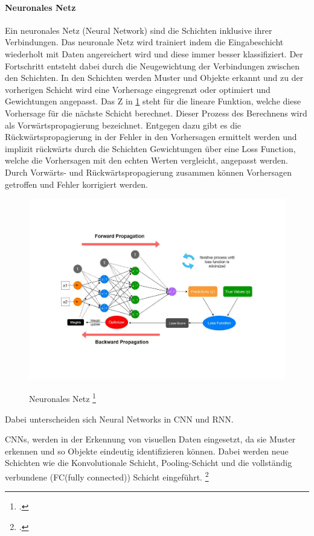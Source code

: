 \paragraph{Neuronales Netz}
Ein neuronales Netz (Neural Network) sind die Schichten inklusive ihrer Verbindungen.
Das neuronale Netz wird trainiert indem die Eingabeschicht 
wiederholt mit Daten angereichert wird und diese immer besser klassifiziert.
Der Fortschritt entsteht dabei durch die Neugewichtung der Verbindungen 
zwischen den Schichten. 
In den Schichten werden Muster und Objekte erkannt und zu der vorherigen Schicht
wird eine Vorhersage eingegrenzt oder optimiert 
und Gewichtungen angepasst. 
Das Z in \ref{fig:NN} steht für die lineare Funktion, 
welche diese Vorhersage für die nächste Schicht berechnet.
Dieser Prozess des Berechnens wird als 
Vorwärtspropagierung bezeichnet. 
Entgegen dazu gibt es die Rückwärtspropagierung 
in der Fehler in den Vorhersagen ermittelt werden 
und implizit rückwärts durch die Schichten 
Gewichtungen über eine Loss Function, 
welche die Vorhersagen mit den echten Werten vergleicht, 
angepasst werden. 
Durch Vorwärts- und Rückwärtspropagierung zusammen 
können Vorhersagen getroffen und Fehler korrigiert werden.
\begin{figure}[htb]
    \centering
    \includegraphics[width=\textwidth]{img/NeuralNetwork.pdf}\\
    \caption{ Neuronales Netz \footcite{pramodithaOverviewNeuralNetwork2022a}}\label{fig:NN}
\end{figure}

  
Dabei unterscheiden sich Neural Networks in 
\gls{CNN} und \gls{RNN}.

CNNs, 
werden in der Erkennung von visuellen Daten eingesetzt, 
da sie Muster erkennen und so Objekte eindeutig identifizieren können.
Dabei werden neue Schichten wie die Konvolutionale Schicht, Pooling-Schicht und
die vollständig verbundene (FC(fully connected)) Schicht eingeführt. 
\footcite{WasSindKonvolutionale2021}

